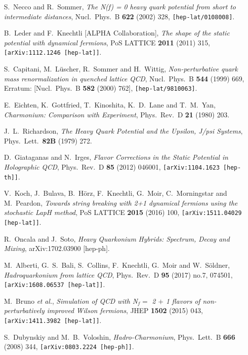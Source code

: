 \documentclass{PoS}
\begin{document}
\begin{thebibliography}{99}
  S.~Necco and R.~Sommer,
  \emph{The N(f) = 0 heavy quark potential from short to intermediate distances},
  Nucl.\ Phys.\ B {\bf 622} (2002) 328,
  {\tt [hep-lat/0108008]}.

  B.~Leder and F.~Knechtli [ALPHA Collaboration],
  \emph{The shape of the static potential with dynamical fermions},
  PoS LATTICE {\bf 2011} (2011) 315,
  {\tt [arXiv:1112.1246 [hep-lat]]}.

  S.~Capitani, M.~L{\"u}scher, R.~Sommer and H.~Wittig,
  \emph{Non-perturbative quark mass renormalization in quenched lattice QCD},
  Nucl.\ Phys.\ B {\bf 544} (1999) 669,
   Erratum: [Nucl.\ Phys.\ B {\bf 582} (2000) 762],
  {\tt [hep-lat/9810063]}.

  E.~Eichten, K.~Gottfried, T.~Kinoshita, K.~D.~Lane and T.~M.~Yan,
  \emph{Charmonium: Comparison with Experiment},
  Phys.\ Rev.\ D {\bf 21} (1980) 203.

  J.~L.~Richardson,
  \emph{The Heavy Quark Potential and the Upsilon, J/psi Systems},
  Phys.\ Lett.\  {\bf 82B} (1979) 272.

  D.~Giataganas and N.~Irges,
  \emph{Flavor Corrections in the Static Potential in Holographic QCD},
  Phys.\ Rev.\ D {\bf 85} (2012) 046001,
  {\tt [arXiv:1104.1623 [hep-th]]}.

  V.~Koch, J.~Bulava, B.~H{\"o}rz, F.~Knechtli, G.~Moir, C.~Morningstar and M.~Peardon,
  \emph{Towards string breaking with 2+1 dynamical fermions using the stochastic LapH method},
  PoS LATTICE {\bf 2015} (2016) 100,
  {\tt [arXiv:1511.04029 [hep-lat]]}.

  R.~Oncala and J.~Soto,
  \emph{Heavy Quarkonium Hybrids: Spectrum, Decay and Mixing},
  arXiv:1702.03900 [hep-ph].

  M.~Alberti, G.~S.~Bali, S.~Collins, F.~Knechtli, G.~Moir and W.~Söldner,
  \emph{Hadroquarkonium from lattice QCD},
  Phys.\ Rev.\ D {\bf 95} (2017) no.7,  074501,
  {\tt [arXiv:1608.06537 [hep-lat]]}.

  M.~Bruno {\it et al.},
  \emph{Simulation of QCD with N$_{f} =$ 2 $+$ 1 flavors of non-perturbatively improved Wilson fermions},
  JHEP {\bf 1502} (2015) 043,
  {\tt [arXiv:1411.3982 [hep-lat]]}.

  S.~Dubynskiy and M.~B.~Voloshin,
  \emph{Hadro-Charmonium},
  Phys.\ Lett.\ B {\bf 666} (2008) 344,
  {\tt [arXiv:0803.2224 [hep-ph]]}.


\end{thebibliography}
\end{document}
